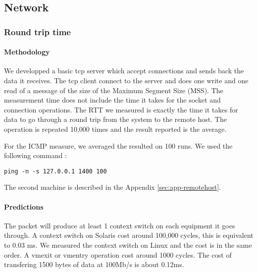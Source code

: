 \newpage
\subsection{Network}

\subsubsection{Round trip time}


\paragraph{Methodology}
We developped a basic tcp server which accept connections and sends back the
data it receives.
The tcp client connect to the server and does one write and one read of a message of
the size of the Maximum Segment Size (MSS).
The measurement time does not include the time it takes for the socket and
connection operations.
The RTT we measured is exactly the time it takes for data to go through a round trip from the system to the remote host.
The operation is repeated 10,000 times and the result reported is the average.

For the ICMP measure, we averaged the resulted on 100 runs.
We used the following command :
\begin{verbatim}
ping -n -s 127.0.0.1 1400 100
\end{verbatim}

The second machine is described in the Appendix \ref{sec:app-remotehost}.

\paragraph{Predictions}
The packet will produce at least 1 context switch on each equipment it goes
through.
A context switch on Solaris cost around 100,000 cycles, this
is equivalent to 0.03 ms.
We measured the context switch on Linux and the cost is in the same order.
A vmexit or vmentry operation cost around 1000 cycles.
The cost of transfering 1500 bytes of data at 100Mb/s is about 0.12ms.

